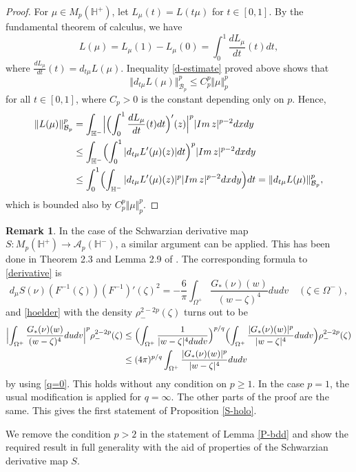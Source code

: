 \documentclass[amstex,12pt,reqno]{amsart}
\theoremstyle{definition}
\newtheorem{remark}{Remark}
\begin{document}
\begin{proof}
For $\mu \in M_p(\mathbb H^+)$, let $L_\mu(t)=L(t\mu)$ for $t \in [0,1]$. 
By the fundamental theorem of calculus, we have
$$
L(\mu)=L_\mu(1)-L_\mu(0)=\int_0^1 \frac{dL_\mu}{dt}(t) dt,
$$
where $\frac{dL_\mu}{dt}(t)=d_{t\mu}L(\mu)$. Inequality \eqref{d-estimate} proved above shows that
$$
\Vert d_{t\mu}L(\mu) \Vert_{{\mathcal B}_p}^p \leq C_p^p \Vert \mu \Vert_p^p
$$
for all $t \in [0,1]$, where $C_p>0$ is the constant depending only on $p$. Hence,
\begin{align}
\Vert L(\mu) \Vert_{{\mathcal B}_p}^p&=\int_{\mathbb H^-}
\Bigl|\Bigl(\int_0^1 \frac{dL_\mu}{dt}(t) dt\Bigr)'(z)\Bigr|^p
|{\rm Im}\,z|^{p-2} dxdy\\
&\leq \int_{\mathbb H^-}
\Bigl(\int_0^1 |d_{t\mu}L'(\mu)(z)| dt\Bigr)^p
|{\rm Im}\,z|^{p-2} dxdy\\
&\leq 
\int_0^1 \Bigl(\int_{\mathbb H^-} |d_{t\mu}L'(\mu)(z)|^p |{\rm Im}\,z|^{p-2} dxdy \Bigr) dt
=\Vert d_{t\mu}L(\mu) \Vert_{{\mathcal B}_p}^p,
\end{align}
which is bounded also by $C_p^p \Vert \mu \Vert_p^p$.
\end{proof}

\begin{remark}\label{S-case}
In the case of the Schwarzian derivative map $S:M_p(\mathbb H^+) \to {\mathcal A}_p(\mathbb H^-)$, 
a similar argument can be applied. This has been done in Theorem 2.3 and Lemma 2.9 of \cite[Chapter I]{TT}. 
The corresponding formula to \eqref{derivative} is
$$
d_\mu S(\nu)(F^{-1}(\zeta))(F^{-1})'(\zeta)^2=-\frac{6}{\pi} \int_{\Omega^+} \frac{G_*(\nu)(w)}{(w-\zeta)^4}dudv 
\quad (\zeta \in \Omega^-),
$$
and \eqref{hoelder} with the density $\rho_-^{2-2p}(\zeta)$ turns out to be
\begin{align}
\Bigl|\int_{\Omega^+} \frac{G_*(\nu)(w)}{(w-\zeta)^4}dudv \Bigr|^p\rho_-^{2-2p}(\zeta)
&\leq \Bigl(\int_{\Omega^+} \frac{1}{|w-\zeta|^{4}dudv}\Bigr)^{p/q}\Bigl(\int_{\Omega^+} \frac{|G_*(\nu)(w)|^p}{|w-\zeta|^4}dudv\Bigr)\rho_-^{2-2p}(\zeta)\\
& \leq (4\pi)^{p/q}\int_{\Omega^+} \frac{|G_*(\nu)(w)|^p}{|w-\zeta|^4}dudv
\end{align}
by using \eqref{q=0}. This holds without any condition on $p \geq 1$. In the case $p=1$,
the usual modification is applied for $q=\infty$. The other parts of the proof are the same.
This gives the first statement of Proposition \ref{S-holo}.
\end{remark}

We remove the condition $p>2$ in the statement of Lemma \ref{P-bdd} and show the required result
in full generality with the aid of properties of the Schwarzian derivative map $S$.
\end{document}
